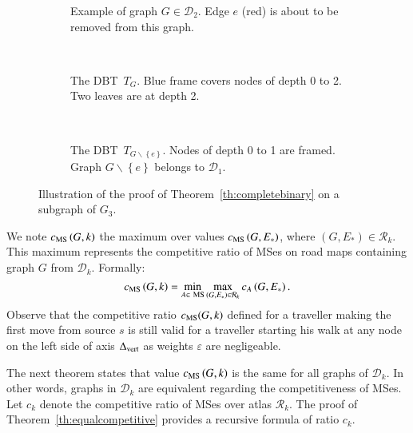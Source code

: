 \documentclass[preprint]{elsarticle}
\newcommand{\set}[1]{\left\{ #1 \right\}}
\newcommand{\mcalr}{\mathcal{R}}
\newcommand{\mcald}{\mathcal{D}}
\newcommand{\mts}{MS}
\newcommand{\deltavert}{\Delta_{\mbox{\scriptsize{vert}}}}
\newcommand{\cms}{c_{\mbox{\scriptsize{MS}}}}
\newcommand{\ebt}{DBT}
\begin{document}
\begin{figure}[h]
\centering
\begin{subfigure}[b]{0.3\columnwidth}
\centering
\scalebox{.40}{}
\caption{Example of graph $G \in \mcald_2$. Edge $e$ (red) is about to be removed from this graph.}
\label{subfig:proofth1_a}
\end{subfigure}
~
\begin{subfigure}[b]{0.3\columnwidth}
\centering
\scalebox{.55}{}
\caption{The \ebt ~$T_{G}$. Blue frame covers nodes of depth 0 to 2. Two leaves are at depth 2.}
\label{subfig:proofth1_b}
\end{subfigure}
~
\begin{subfigure}[b]{0.3\columnwidth}
\centering
\scalebox{.55}{}
\caption{The \ebt ~$T_{G \backslash \set{e}}$. Nodes of depth 0 to 1 are framed. Graph $G\backslash \set{e}$ belongs to $\mcald_1$.}
\label{subfig:proofth1_c}
\end{subfigure}
\caption{Illustration of the proof of Theorem~\ref{th:completebinary} on a subgraph of $G_3$.}
\label{fig:proofth1}
\end{figure}


We note $\cms\left(G, k\right)$ the maximum over values $\cms\left(G,E_*\right)$, where $\left(G,E_*\right) \in \mcalr_k$. This maximum represents the competitive ratio of \mts es on road maps containing graph $G$ from $\mcald_k$. Formally: 
\begin{equation}
\cms\left(G, k\right) = \min\limits_{A \in ~\mbox{\scriptsize {MS}}} \max\limits_{\left(G,E_*\right) \in \mcalr_k} c_A\left(G,E_*\right).
\label{eq:cmsg}
\end{equation}
Observe that the competitive ratio $\cms(G,k)$ defined for a traveller making the first move from source $s$ is still valid for a traveller starting his walk at any node on the left side of axis $\deltavert$ as weights $\varepsilon$ are negligeable. 

The next theorem states that value $\cms\left(G, k\right)$ is the same for all graphs of $\mcald_k$. In other words, graphs in $\mcald_k$ are equivalent regarding the competitiveness of \mts es. Let $c_k$ denote the competitive ratio of \mts es over atlas $\mcalr_k$. The proof of Theorem~\ref{th:equalcompetitive} provides a recursive formula of ratio $c_k$.
\end{document}

